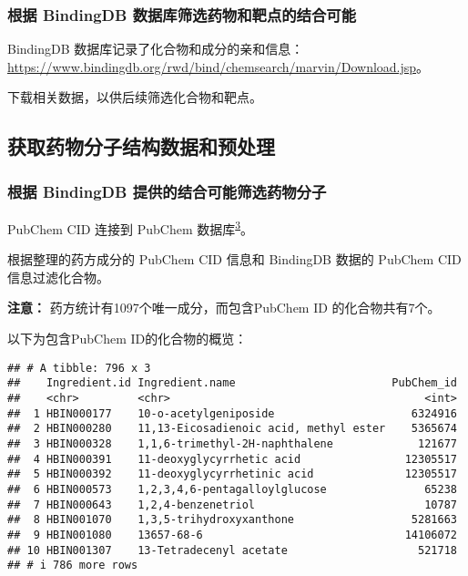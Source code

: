 \documentclass[
]{article}
\begin{document}
\hypertarget{ux6839ux636e-bindingdb-ux6570ux636eux5e93ux7b5bux9009ux836fux7269ux548cux9776ux70b9ux7684ux7ed3ux5408ux53efux80fd}{%
\subsubsection{根据 BindingDB 数据库筛选药物和靶点的结合可能}\label{ux6839ux636e-bindingdb-ux6570ux636eux5e93ux7b5bux9009ux836fux7269ux548cux9776ux70b9ux7684ux7ed3ux5408ux53efux80fd}}

BindingDB 数据库记录了化合物和成分的亲和信息： \url{https://www.bindingdb.org/rwd/bind/chemsearch/marvin/Download.jsp}。

下载相关数据，以供后续筛选化合物和靶点。

\hypertarget{ux83b7ux53d6ux836fux7269ux5206ux5b50ux7ed3ux6784ux6570ux636eux548cux9884ux5904ux7406}{%
\subsection{获取药物分子结构数据和预处理}\label{ux83b7ux53d6ux836fux7269ux5206ux5b50ux7ed3ux6784ux6570ux636eux548cux9884ux5904ux7406}}

\hypertarget{par}{%
\subsubsection{根据 BindingDB 提供的结合可能筛选药物分子}\label{par}}

PubChem CID 连接到 PubChem 数据库\textsuperscript{\protect\hyperlink{ref-PubchemSubstanKimS2015}{3}}。

根据整理的药方成分的 PubChem CID 信息和 BindingDB 数据的 PubChem CID 信息过滤化合物。

\textbf{注意：} 药方统计有1097个唯一成分，而包含PubChem ID 的化合物共有7个。

以下为包含PubChem ID的化合物的概览：

\begin{verbatim}
## # A tibble: 796 x 3
##    Ingredient.id Ingredient.name                        PubChem_id
##    <chr>         <chr>                                       <int>
##  1 HBIN000177    10-o-acetylgeniposide                     6324916
##  2 HBIN000280    11,13-Eicosadienoic acid, methyl ester    5365674
##  3 HBIN000328    1,1,6-trimethyl-2H-naphthalene             121677
##  4 HBIN000391    11-deoxyglycyrrhetic acid                12305517
##  5 HBIN000392    11-deoxyglycyrrhetinic acid              12305517
##  6 HBIN000573    1,2,3,4,6-pentagalloylglucose               65238
##  7 HBIN000643    1,2,4-benzenetriol                          10787
##  8 HBIN001070    1,3,5-trihydroxyxanthone                  5281663
##  9 HBIN001080    13657-68-6                               14106072
## 10 HBIN001307    13-Tetradecenyl acetate                    521718
## # i 786 more rows
\end{verbatim}
\end{document}
